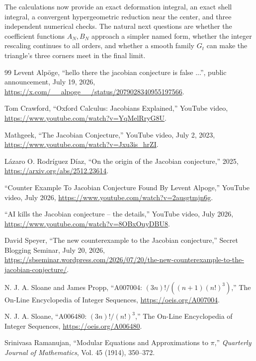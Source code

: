 \documentclass[11pt]{article}
\begin{document}
The calculations now provide an exact deformation integral, an exact shell
integral, a convergent hypergeometric reduction near the center, and three
independent numerical checks. The natural next questions are whether the
coefficient functions $A_N,B_N$ approach a simpler named form, whether the
integer rescaling continues to all orders, and whether a smooth family $G_t$
can make the triangle's three corners meet in the final limit.

\begin{thebibliography}{99}
Levent Alp\"oge,
``hello there the jacobian conjecture is false ...'', public announcement,
July 19, 2026,
\url{https://x.com/__alpoge__/status/2079028340955197566}.

Tom Crawford,
``Oxford Calculus: Jacobians Explained,''
YouTube video,
\url{https://www.youtube.com/watch?v=YqMelRryG8U}.

Mathgeek,
``The Jacobian Conjecture,''
YouTube video, July 2, 2023,
\url{https://www.youtube.com/watch?v=Jxu3is_hrZI}.

L\'azaro O. Rodr\'iguez D\'iaz,
``On the origin of the Jacobian conjecture,''
2025,
\url{https://arxiv.org/abs/2512.23614}.

``Counter Example To Jacobian Conjecture Found By Levent Alpoge,''
YouTube video, July 2026,
\url{https://www.youtube.com/watch?v=2ausgtmjn6g}.

``AI kills the Jacobian conjecture -- the details,''
YouTube video, July 2026,
\url{https://www.youtube.com/watch?v=8OBxOuyDBU8}.

David Speyer,
``The new counterexample to the Jacobian conjecture,''
Secret Blogging Seminar, July 20, 2026,
\url{https://sbseminar.wordpress.com/2026/07/20/the-new-counterexample-to-the-jacobian-conjecture/}.

N. J. A. Sloane and James Propp,
``A007004: $(3n)!/((n+1)(n!)^3)$,''
The On-Line Encyclopedia of Integer Sequences,
\url{https://oeis.org/A007004}.

N. J. A. Sloane,
``A006480: $(3n)!/(n!)^3$,''
The On-Line Encyclopedia of Integer Sequences,
\url{https://oeis.org/A006480}.

Srinivasa Ramanujan,
``Modular Equations and Approximations to $\pi$,''
\emph{Quarterly Journal of Mathematics}, Vol. 45 (1914), 350--372.
\end{thebibliography}
\end{document}
